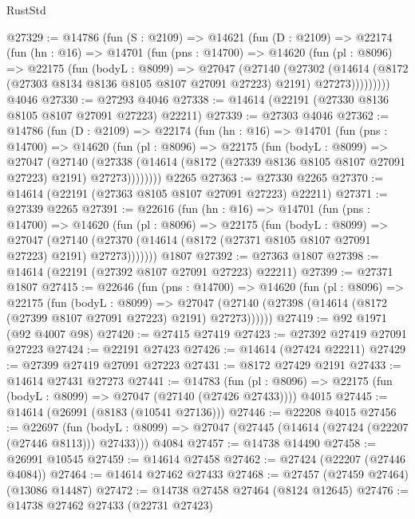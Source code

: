 \begin{lexlean}{RustStd}
\begin{coremodule}
@27329 := @14786
    (fun (S : @2109) =>
    @14621
      (fun (D : @2109) =>
      @22174
        (fun (hn : @16) =>
        @14701
          (fun (pns : @14700) =>
          @14620
            (fun (pl : @8096) =>
            @22175
              (fun (bodyL : @8099) =>
              @27047
                (@27140
                  (@27302
                    (@14614
                      (@8172 (@27303 @8134 @8136 @8105 @8107 @27091 @27223) @2191)
                      @27273)))))))))
    @4046
@27330 := @27293 @4046
@27338 := @14614 (@22191 (@27330 @8136 @8105 @8107 @27091 @27223) @22211)
@27339 := @27303 @4046
@27362 := @14786
    (fun (D : @2109) =>
    @22174
      (fun (hn : @16) =>
      @14701
        (fun (pns : @14700) =>
        @14620
          (fun (pl : @8096) =>
          @22175
            (fun (bodyL : @8099) =>
            @27047
              (@27140
                (@27338
                  (@14614 (@8172 (@27339 @8136 @8105 @8107 @27091 @27223) @2191) @27273))))))))
    @2265
@27363 := @27330 @2265
@27370 := @14614 (@22191 (@27363 @8105 @8107 @27091 @27223) @22211)
@27371 := @27339 @2265
@27391 := @22616
    (fun (hn : @16) =>
    @14701
      (fun (pns : @14700) =>
      @14620
        (fun (pl : @8096) =>
        @22175
          (fun (bodyL : @8099) =>
          @27047
            (@27140 (@27370 (@14614 (@8172 (@27371 @8105 @8107 @27091 @27223) @2191) @27273)))))))
    @1807
@27392 := @27363 @1807
@27398 := @14614 (@22191 (@27392 @8107 @27091 @27223) @22211)
@27399 := @27371 @1807
@27415 := @22646
    (fun (pns : @14700) =>
    @14620
      (fun (pl : @8096) =>
      @22175
        (fun (bodyL : @8099) =>
        @27047 (@27140 (@27398 (@14614 (@8172 (@27399 @8107 @27091 @27223) @2191) @27273))))))
@27419 := @92 @1971 (@92 @4007 @98)
@27420 := @27415 @27419
@27423 := @27392 @27419 @27091 @27223
@27424 := @22191 @27423
@27426 := @14614 (@27424 @22211)
@27429 := @27399 @27419 @27091 @27223
@27431 := @8172 @27429 @2191
@27433 := @14614 @27431 @27273
@27441 := @14783
    (fun (pl : @8096) => @22175 (fun (bodyL : @8099) => @27047 (@27140 (@27426 @27433))))
    @4015
@27445 := @14614 (@26991 (@8183 (@10541 @27136)))
@27446 := @22208 @4015
@27456 := @22697
    (fun (bodyL : @8099) => @27047 (@27445 (@14614 (@27424 (@22207 (@27446 @8113))) @27433)))
    @4084
@27457 := @14738 @14490
@27458 := @26991 @10545
@27459 := @14614 @27458
@27462 := @27424 (@22207 (@27446 @4084))
@27464 := @14614 @27462 @27433
@27468 := @27457 (@27459 @27464) (@13086 @14487)
@27472 := @14738 @27458 @27464 (@8124 @12645)
@27476 := @14738 @27462 @27433 (@22731 @27423)

\end{coremodule}
\end{lexlean}
